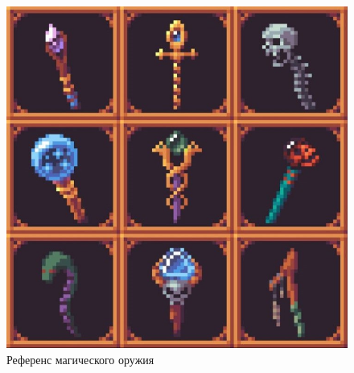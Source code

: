 \documentclass{article}
\begin{document}
\begin{itemize}
\begin{figure}[H]
\begin{minipage}{0.4\textwidth}
				\includegraphics[width=\textwidth]{images/magical.jpg}
				\caption{Референс магического оружия}
				\label{fig:weapon2}
			\end{minipage}
		\end{figure}


\end{itemize}
\end{document}
